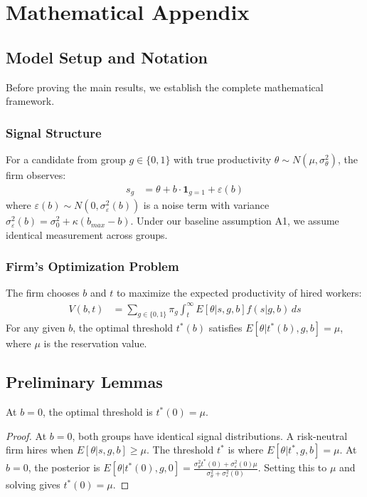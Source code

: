 \section{Mathematical Appendix}

\subsection{Model Setup and Notation}

Before proving the main results, we establish the complete mathematical framework.

\subsubsection{Signal Structure}
For a candidate from group $g \in \{0,1\}$ with true productivity $\theta \sim N(\mu, \sigma_\theta^2)$, the firm observes:
\begin{align}
s_g &= \theta + b \cdot \mathbf{1}_{g=1} + \varepsilon(b)
\end{align}
where $\varepsilon(b) \sim N(0, \sigma_\varepsilon^2(b))$ is a noise term with variance $\sigma_\varepsilon^2(b) = \sigma_0^2 + \kappa(b_{max} - b)$. Under our baseline assumption A1, we assume identical measurement across groups.

\subsubsection{Firm's Optimization Problem}
The firm chooses $b$ and $t$ to maximize the expected productivity of hired workers:
\begin{align}
V(b,t) &= \sum_{g \in \{0,1\}} \pi_g \int_t^\infty E[\theta | s, g, b] f(s|g,b) \, ds \label{eq:value_function_appendix}
\end{align}
For any given $b$, the optimal threshold $t^*(b)$ satisfies $E[\theta | t^*(b), g, b] = \mu$, where $\mu$ is the reservation value.

\subsection{Preliminary Lemmas}

\begin{lemma}
At $b = 0$, the optimal threshold is $t^*(0) = \mu$.
\end{lemma}
\begin{proof}
At $b = 0$, both groups have identical signal distributions. A risk-neutral firm hires when $E[\theta|s,g,b] \geq \mu$. The threshold $t^*$ is where $E[\theta|t^*, g, b] = \mu$.
At $b=0$, the posterior is $E[\theta | t^*(0), g, 0] = \frac{\sigma_\theta^2 t^*(0) + \sigma_\varepsilon^2(0) \mu}{\sigma_\theta^2 + \sigma_\varepsilon^2(0)}$. Setting this to $\mu$ and solving gives $t^*(0)=\mu$.
\end{proof}

